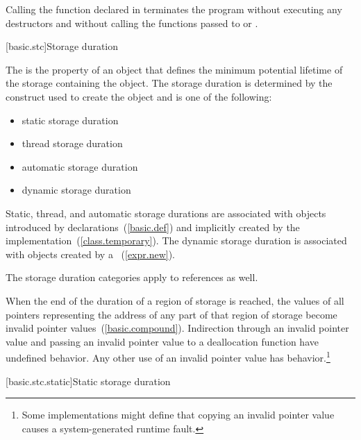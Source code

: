 \pnum
{}%
%
%
Calling the function  declared in
%
 terminates the program without executing any destructors
and without calling
the functions passed to  or .%

[basic.stc]{Storage duration}

\pnum
{}%
The  is the property of an object that defines the minimum
potential lifetime of the storage containing the object. The storage
duration is determined by the construct used to create the object and is
one of the following:

\begin{itemize}
\item static storage duration
\item thread storage duration
\item automatic storage duration
\item dynamic storage duration
\end{itemize}

\pnum
{}%
%
%
%
Static, thread, and automatic storage durations are associated with objects
introduced by declarations~(\ref{basic.def}) and implicitly created by
the implementation~(\ref{class.temporary}). The dynamic storage duration
is associated with objects created by a
~(\ref{expr.new}).

\pnum
The storage duration categories apply to references as well.

\pnum
When the end of the duration of a region of storage is reached,
the values of all pointers
representing the address of any part of that region of storage
become invalid pointer values~(\ref{basic.compound}).
Indirection through an invalid pointer value and
passing an invalid pointer value to a deallocation function
have undefined behavior.
Any other use of an invalid pointer value has
behavior.\footnote{Some implementations might define that
copying an invalid pointer value
causes a system-generated runtime fault.}

[basic.stc.static]{Static storage duration}

